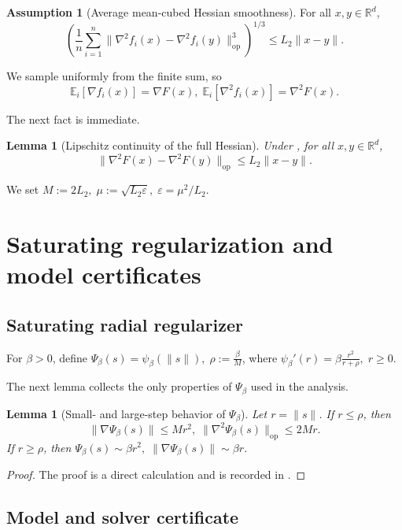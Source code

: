 \documentclass{article}
\theoremstyle{plain}
\newtheorem{lemma}[theorem]{Lemma}
\theoremstyle{definition}
\newtheorem{assumption}[theorem]{Assumption}
\theoremstyle{remark}
\begin{document}
\begin{assumption}[Average mean-cubed Hessian smoothness]\label{ass:H}
For all \(x,y\in\mathbb R^d\),
\[
\textstyle \left(\frac1n\sum_{i=1}^n
\|\nabla^2 f_i(x)-\nabla^2 f_i(y)\|_{\mathrm{op}}^3\right)^{1/3}
\le L_2\|x-y\|.
\]
\end{assumption}

We sample uniformly from the finite sum, so
\[
\mathbb E_i[\nabla f_i(x)] = \nabla F(x),
\;
\mathbb E_i[\nabla^2 f_i(x)] = \nabla^2F(x).
\]

The next fact is immediate.

\begin{lemma}[Lipschitz continuity of the full Hessian]\label{lem:hess-lip}
Under , for all \(x,y\in\mathbb R^d\),
\[
\|\nabla^2F(x)-\nabla^2F(y)\|_{\mathrm{op}}
\le L_2\|x-y\|.
\]
\end{lemma}

We set $M:=2L_2,\; \mu:=\sqrt{L_2\varepsilon},\; \varepsilon=\mu^2/L_2$.

\section{Saturating regularization and model certificates}\label{sec:regularizer}

\subsection{Saturating radial regularizer}

For \(\beta>0\), define $
\Psi_\beta(s)=\psi_\beta(\|s\|),\;
\rho:=\frac{\beta}{M}$,
where $\psi_\beta'(r)=\beta\frac{r^2}{r+\rho},\; r\ge 0$.

The next lemma collects the only properties of \(\Psi_\beta\) used in the analysis.

\begin{lemma}[Small- and large-step behavior of \(\Psi_\beta\)]\label{lem:psi-main}
Let \(r=\|s\|\). If \(r\le \rho\), then
\[
\|\nabla \Psi_\beta(s)\|\le Mr^2,
\;
\|\nabla^2 \Psi_\beta(s)\|_{\mathrm{op}}\le 2Mr.
\]
If \(r\ge \rho\), then $\Psi_\beta(s)\sim \beta r^2,
\;
\|\nabla \Psi_\beta(s)\|\sim \beta r$.
\end{lemma}

\begin{proof}
The proof is a direct calculation and is recorded in .
\end{proof}

\subsection{Model and solver certificate}
\end{document}
